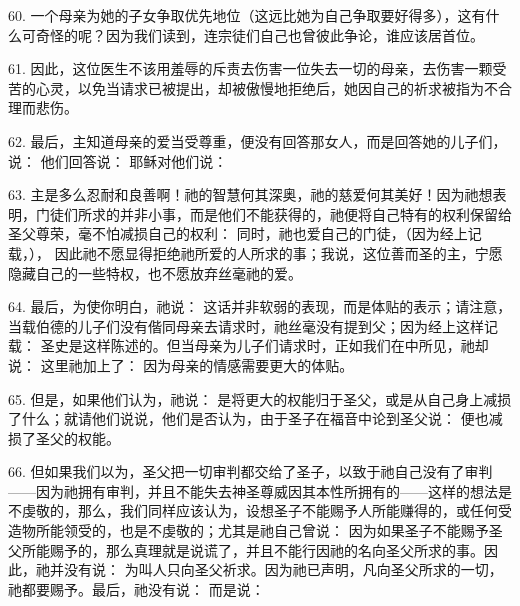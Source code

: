 60. 一个母亲为她的子女争取优先地位（这远比她为自己争取要好得多），这有什么可奇怪的呢？因为我们读到，连宗徒们自己也曾彼此争论，谁应该居首位。\par

61. 因此，这位医生不该用羞辱的斥责去伤害一位失去一切的母亲，去伤害一颗受苦的心灵，以免当请求已被提出，却被傲慢地拒绝后，她因自己的祈求被指为不合理而悲伤。\par

62. 最后，主知道母亲的爱当受尊重，便没有回答那女人，而是回答她的儿子们，说： 他们回答说： 耶稣对他们说： \par

63. 主是多么忍耐和良善啊！祂的智慧何其深奥，祂的慈爱何其美好！因为祂想表明，门徒们所求的并非小事，而是他们不能获得的，祂便将自己特有的权利保留给圣父尊荣，毫不怕减损自己的权利： 同时，祂也爱自己的门徒，（因为经上记载，）， 因此祂不愿显得拒绝祂所爱的人所求的事；我说，这位善而圣的主，宁愿隐藏自己的一些特权，也不愿放弃丝毫祂的爱。 \par

64. 最后，为使你明白，祂说： 这话并非软弱的表现，而是体贴的表示；请注意，当载伯德的儿子们没有偕同母亲去请求时，祂丝毫没有提到父；因为经上这样记载：  圣史是这样陈述的。但当母亲为儿子们请求时，正如我们在中所见，祂却说：  这里祂加上了： 因为母亲的情感需要更大的体贴。\par

65. 但是，如果他们认为，祂说： 是将更大的权能归于圣父，或是从自己身上减损了什么；就请他们说说，他们是否认为，由于圣子在福音中论到圣父说：  便也减损了圣父的权能。\par

66. 但如果我们以为，圣父把一切审判都交给了圣子，以致于祂自己没有了审判——因为祂拥有审判，并且不能失去神圣尊威因其本性所拥有的——这样的想法是不虔敬的，那么，我们同样应该认为，设想圣子不能赐予人所能赚得的，或任何受造物所能领受的，也是不虔敬的；尤其是祂自己曾说： 因为如果圣子不能赐予圣父所能赐予的，那么真理就是说谎了，并且不能行因祂的名向圣父所求的事。因此，祂并没有说： 为叫人只向圣父祈求。因为祂已声明，凡向圣父所求的一切，祂都要赐予。最后，祂没有说： 而是说：\par

